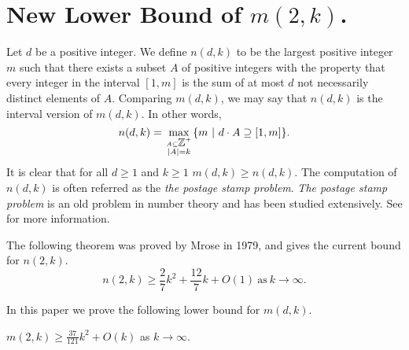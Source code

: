 \section{ New Lower Bound of $m(2, k)$.}

Let $d$ be a positive integer. We define $n(d, k)$ to be the largest positive integer $m$ such that there exists a subset $A$ of positive integers with the property that every integer in the interval $[1, m]$ is the sum of at most $d$ not necessarily distinct elements of $A$. Comparing $m(d, k)$, we may say that $n(d, k)$ is the interval version of $m(d, k)$. In other words, 
\[
n(d, k) = \max_{A\subseteq\mbox{$\mathbb Z$}^{+}\atop\scriptstyle |A|=k}\{m\  |\ d\cdot A\supseteq[1, m]\}.
\]
It is clear that for all $d \geq 1$ and $k \geq 1$ $m(d, k) \geq n(d, k)$. The computation of  $n(d, k)$ is often referred as the \emph{the postage stamp problem}. \emph{The postage stamp problem} is an old problem in number theory and has been studied extensively. See  for more information. 

The following theorem was proved by Mrose in 1979, and gives the current bound for $n(2, k)$.
\[
n(2, k) \geq \frac{2}{7}k^2 + \frac{12}{7}k + O(1)\  \text{as} \  k \to \infty.
\]

 
In this paper we prove the following lower bound for $m(d, k)$.
\begin{theorem}
$\displaystyle m(2,k) \geq \frac{37}{121}k^2 + O(k)$  as $ k \to \infty$.
\end{theorem}


